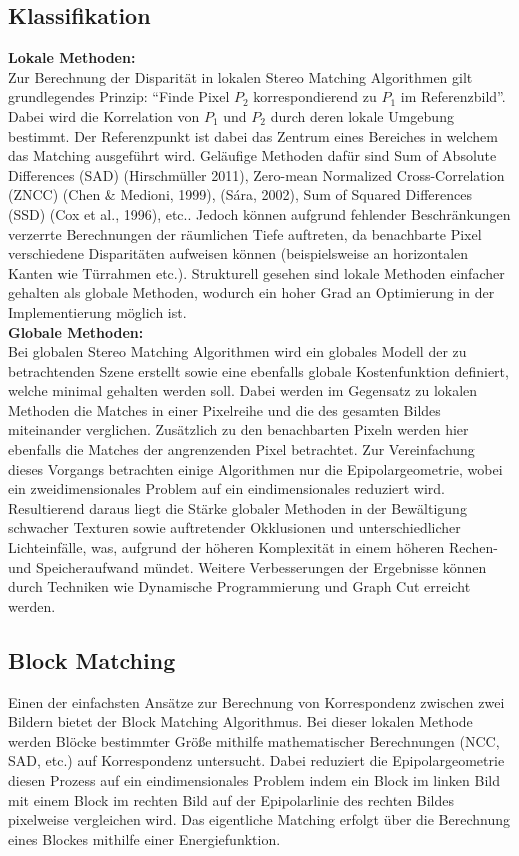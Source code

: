 \subsection{Klassifikation}
\label{subsec:stereo_matching_classification}
\textbf{Lokale Methoden:}\\
Zur Berechnung der Disparität in lokalen Stereo Matching Algorithmen gilt grundlegendes Prinzip: “Finde Pixel $P_2$ korrespondierend zu $P_1$ im Referenzbild”. Dabei wird die Korrelation von $P_1$ und $P_2$ durch deren lokale Umgebung bestimmt. Der Referenzpunkt ist dabei das Zentrum eines Bereiches in welchem das Matching ausgeführt wird. Geläufige Methoden dafür sind Sum of Absolute Differences (SAD) (Hirschmüller 2011), Zero-mean Normalized Cross-Correlation (ZNCC) (Chen \& Medioni, 1999), (Sára, 2002), Sum of Squared Differences (SSD) (Cox et al., 1996), etc..
Jedoch können aufgrund fehlender Beschränkungen verzerrte Berechnungen der räumlichen Tiefe auftreten, da benachbarte Pixel verschiedene Disparitäten aufweisen können (beispielsweise an horizontalen Kanten wie Türrahmen etc.). Strukturell gesehen sind lokale Methoden einfacher gehalten als globale Methoden, wodurch ein hoher Grad an Optimierung in der Implementierung möglich ist.\\

\noindent
\textbf{Globale Methoden:}\\
Bei globalen Stereo Matching Algorithmen wird ein globales Modell der zu betrachtenden Szene erstellt sowie eine ebenfalls globale Kostenfunktion definiert, welche minimal gehalten werden soll. Dabei werden im Gegensatz zu lokalen Methoden die Matches in einer Pixelreihe und die des gesamten Bildes miteinander verglichen. Zusätzlich zu den benachbarten Pixeln werden hier ebenfalls die Matches der angrenzenden Pixel betrachtet. Zur Vereinfachung dieses Vorgangs betrachten einige Algorithmen nur die Epipolargeometrie, wobei ein zweidimensionales Problem auf ein eindimensionales reduziert wird. Resultierend daraus liegt die Stärke globaler Methoden in der Bewältigung schwacher Texturen sowie auftretender Okklusionen und unterschiedlicher Lichteinfälle, was, aufgrund der höheren Komplexität in einem höheren Rechen- und Speicheraufwand mündet. Weitere Verbesserungen der Ergebnisse können durch Techniken wie Dynamische Programmierung und Graph Cut erreicht werden.

\subsection{Block Matching}
\label{subsec:stereo_matching_bm}
Einen der einfachsten Ansätze zur Berechnung von Korrespondenz zwischen zwei Bildern bietet der Block Matching Algorithmus. Bei dieser lokalen Methode werden Blöcke bestimmter Größe mithilfe mathematischer Berechnungen (NCC, SAD, etc.) auf Korrespondenz untersucht. Dabei reduziert die Epipolargeometrie diesen Prozess auf ein eindimensionales Problem indem ein Block im linken Bild mit einem Block im rechten Bild auf der Epipolarlinie des rechten Bildes pixelweise vergleichen wird. Das eigentliche Matching erfolgt über die Berechnung eines Blockes mithilfe einer Energiefunktion.


